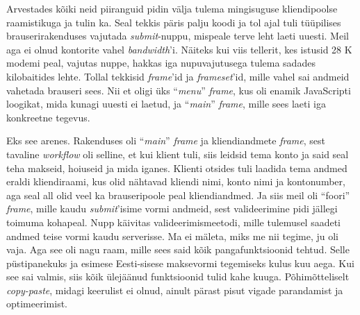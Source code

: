 Arvestades kõiki neid piiranguid pidin välja tulema mingisuguse kliendipoolse 
raamistikuga ja tulin ka. Seal tekkis päris palju koodi ja tol 
ajal tuli tüüpilises brauserirakenduses vajutada \emph{submit}-nuppu, mispeale 
terve leht laeti uuesti. Meil aga ei olnud kontorite vahel \emph{bandwidth}'i. Näiteks kui viis tellerit, kes istusid 28 K 
modemi peal, vajutas nuppe, hakkas iga nupuvajutusega 
tulema sadades kilobaitides lehte. Tollal tekkisid 
\emph{frame}'id ja \emph{frameset}'id, mille vahel sai andmeid 
vahetada brauseri sees. Nii et oligi üks \enquote{\emph{menu}} \emph{frame}, kus oli 
enamik JavaScripti loogikat, mida kunagi uuesti ei laetud, ja 
\enquote{\emph{main}} \emph{frame}, mille sees laeti iga konkreetne tegevus.


Eks see arenes. Rakenduses oli \enquote{\emph{main}} \emph{frame} ja 
kliendiandmete \emph{frame}, sest tavaline \emph{workflow} oli selline, et kui 
klient tuli, siis leidsid tema konto ja said seal teha makseid, 
hoiuseid ja mida iganes. Klienti otsides tuli laadida 
tema andmed eraldi kliendiraami, kus olid nähtavad kliendi nimi, konto nimi ja 
kontonumber, aga seal all olid veel ka brauseripoole peal kliendiandmed. Ja siis 
meil oli \enquote{foori} \emph{frame}, mille kaudu \emph{submit}'isime vormi 
andmeid, sest valideerimine pidi jällegi toimuma kohapeal. Nupp käivitas 
valideerimismeetodi, mille tulemusel saadeti andmed teise vormi 
kaudu serverisse. Ma ei mäleta, miks me nii tegime, ju oli vaja. Aga see 
oli nagu raam, mille sees said kõik pangafunktsioonid tehtud. Selle püstipanekuks ja esimese 
Eesti-sisese maksevormi tegemiseks kulus kuu aega. Kui see sai valmis, siis kõik 
ülejäänud funktsioonid tulid kahe kuuga. Põhimõtteliselt 
\emph{copy-paste}, midagi keerulist ei olnud, ainult pärast pisut vigade 
parandamist ja optimeerimist.


